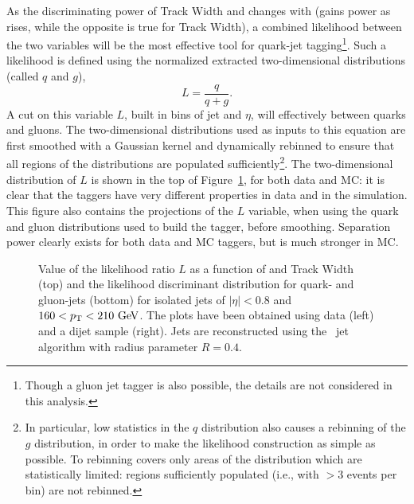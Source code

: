 As the discriminating power of Track Width and \ntrk changes with \pt (\ntrk gains power as \pt rises, while the opposite is true for Track Width), a combined likelihood between the two variables will be the most effective tool for quark-jet tagging\footnote{Though a gluon jet tagger is also possible, the details are not considered in this analysis.}. Such a likelihood is defined using the normalized extracted two-dimensional distributions (called $q$ and $g$),
%
\begin{equation}
L=\frac{q}{q+g}.
\end{equation}
%
A cut on this variable $L$, built in bins of jet \pt and $\eta$, will effectively between quarks and gluons. The two-dimensional distributions used as inputs to this equation are first smoothed with a Gaussian kernel and dynamically rebinned to ensure that all regions of the distributions are populated sufficiently\footnote{In particular, low statistics in the $q$ distribution also causes a rebinning of the $g$ distribution, in order to make the likelihood construction as simple as possible. To rebinning covers only areas of the distribution which are statistically limited: regions sufficiently populated (i.e., with $> 3$ events per bin) are not rebinned.}. The two-dimensional distribution of $L$ is shown in the top of Figure~\ref{fig:jet-reconstruction:qg:likelihoodSample}, for both data and MC: it is clear that the taggers have very different properties in data and in the simulation. This figure also contains the projections of the $L$ variable, when using the quark and gluon distributions used to build the tagger, before smoothing. Separation power clearly exists for both data and MC taggers, but is much stronger in MC.



\begin{figure}[tbp]
\begin{center}
\caption{ Value of the likelihood ratio $L$ as a function of \ntrk and Track Width (top) and the likelihood discriminant distribution for quark- and gluon-jets (bottom) for isolated jets 
of $|\eta|<0.8$ and $160<\pt<210\GeV$. The plots have been obtained using data (left) and
a  dijet sample (right). Jets are reconstructed using the \akt\ jet algorithm
with radius parameter $R=0.4$. }
\label{fig:jet-reconstruction:qg:likelihoodSample}
\end{center}
\end{figure}

